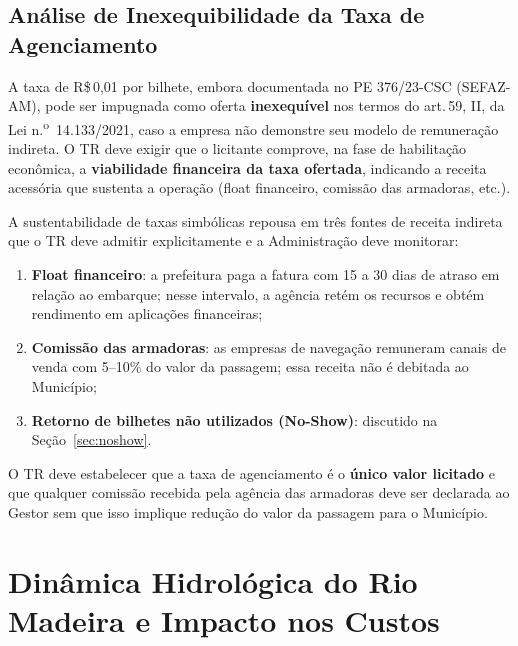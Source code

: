 \documentclass[12pt,a4paper]{article}
\newcommand{\art}[1]{art.\,#1}
\newcommand{\Rs}{R\$\,}
\begin{document}
\subsection{Análise de Inexequibilidade da Taxa de Agenciamento}

\begin{warnbox}
\small
A taxa de \Rs 0,01 por bilhete, embora documentada no PE 376/23-CSC (SEFAZ-AM),
pode ser impugnada como oferta \textbf{inexequível} nos termos do \art{59}, II,
da Lei n.\textsuperscript{o}~14.133/2021, caso a empresa não demonstre seu
modelo de remuneração indireta. O TR deve exigir que o licitante comprove,
na fase de habilitação econômica, a \textbf{viabilidade financeira da taxa
ofertada}, indicando a receita acessória que sustenta a operação (float
financeiro, comissão das armadoras, etc.).
\end{warnbox}

A sustentabilidade de taxas simbólicas repousa em três fontes de receita
indireta que o TR deve admitir explicitamente e a Administração deve monitorar:

\begin{enumerate}
  \item \textbf{Float financeiro}: a prefeitura paga a fatura com 15 a 30 dias
    de atraso em relação ao embarque; nesse intervalo, a agência retém os
    recursos e obtém rendimento em aplicações financeiras;
  \item \textbf{Comissão das armadoras}: as empresas de navegação remuneram
    canais de venda com 5--10\% do valor da passagem; essa receita não é
    debitada ao Município;
  \item \textbf{Retorno de bilhetes não utilizados (No-Show)}: discutido na
    Seção~\ref{sec:noshow}.
\end{enumerate}

O TR deve estabelecer que a taxa de agenciamento é o \textbf{único valor
licitado} e que qualquer comissão recebida pela agência das armadoras deve ser
declarada ao Gestor sem que isso implique redução do valor da passagem para o
Município.

\section{Dinâmica Hidrológica do Rio Madeira e Impacto nos Custos}
\end{document}
